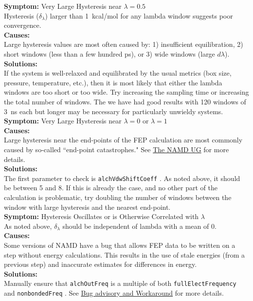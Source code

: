 \documentclass[9pt,tutorial]{Styling/livecoms}
\newcommand{\textInput}[1]{
  \texttt{#1}
}
\begin{document}
\noindent\textbf{Symptom:} Very Large Hysteresis near $\lambda=0.5$\\
Hysteresis ($\delta_\lambda$) larger than 1~kcal/mol for any lambda window suggests poor convergence.\\
\textbf{Causes:}\\
Large hysteresis values are most often caused by: 1) insufficient equilibration, 2) short windows (less than a few hundred ps), or 3) wide windows (large $d\lambda$).\\
\textbf{Solutions:}\\
If the system is well-relaxed and equilibrated by the usual metrics (box size, pressure, temperature, etc.), then it is most likely that either the lambda windows are too short or too wide. Try increasing the sampling time or increasing the total number of windows. The we have had good results with 120 windows of 3~ns each but longer may be necessary for particularly unwieldy systems.\\

\noindent\textbf{Symptom:}  Very Large Hysteresis near $\lambda=0$ or $\lambda=1$\\
\textbf{Causes:}\\
Large hysteresis near the end-points of the FEP calculation are most commonly caused by so-called ``end-point catastrophes." See \href{https://www.ks.uiuc.edu/Research/namd/2.14/ug/node63.html}{The NAMD UG} for more details. \cite{Bernardi2020}\\  
\textbf{Solutions:}\\
The first parameter to check is \textInput{alchVdwShiftCoeff}. As noted above, it should be between 5 and 8. If this is already the case, and no other part of the calculation is problematic, try doubling the number of windows between the window with large hysteresis and the nearest end-point.\\

\noindent\textbf{Symptom:}  Hysteresis Oscillates or is Otherwise Correlated with $\lambda$\\
As noted above, $\delta_\lambda$ should be independent of lambda with a mean of 0. \\
\textbf{Causes:}\\
Some versions of NAMD have a bug that allows FEP data to be written on a step without energy calculations. This results in the use of stale energies (from a previous step) and inaccurate estimates for differences in energy.\\
\textbf{Solutions:}\\
Manually ensure that \textInput{alchOutFreq} is a multiple of both \textInput{fullElectFrequency} and \textInput{nonbondedFreq}. See \href{https://www.ks.uiuc.edu/Research/namd/mailing_list/namd-l.2020-2021/1487.html}{Bug advisory and Workaround} for more details.\\
\end{document}
